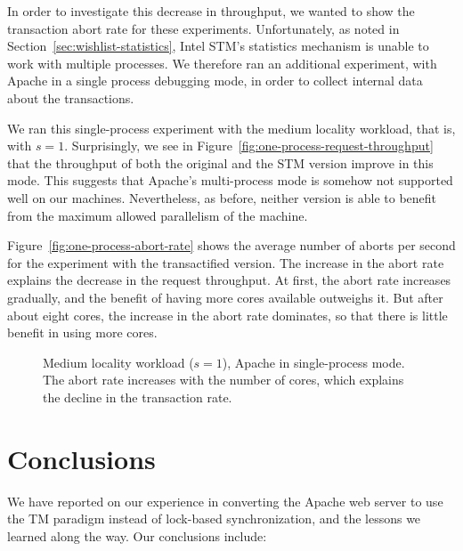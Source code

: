 \documentclass[preprint,11pt]{sigplanconf}
\begin{document}
In order to investigate this decrease in throughput, we wanted to show the
transaction abort rate for these experiments. Unfortunately, as noted in
Section~\ref{sec:wishlist-statistics}, Intel STM's statistics mechanism
is unable to work with multiple processes. We therefore ran an additional
experiment, with Apache in a single process debugging mode, in order to collect
internal data about the transactions. 

We ran this single-process experiment with the medium locality workload,
that is, with $s=1$. Surprisingly, we see
in Figure~\ref{fig:one-process-request-throughput} that the
throughput of both the original and the STM version improve in this mode.
This suggests that Apache's multi-process mode is somehow not supported
well on our machines. Nevertheless, as before, neither version is able to 
benefit from the maximum allowed parallelism of the machine. 

Figure~\ref{fig:one-process-abort-rate} shows the average number of aborts
per second for the experiment with the transactified version. 
The increase in the abort rate explains the decrease in the request
throughput. At first, the abort rate increases gradually, 
and the benefit of having more cores available outweighs it.
But after about eight cores, the increase in the abort rate dominates,
so that there is little benefit in using more cores. 

\begin{figure}
 \centering
 \hfill
 \caption{Medium locality workload ($s = 1$), Apache in single-process mode.
 The abort rate increases with the number of cores, which explains the decline 
 in the transaction rate.}
\end{figure}

\section{Conclusions}\label{sec:conclusions}

We have reported on our experience in converting the Apache web 
server to use the TM paradigm instead of lock-based synchronization,
and the lessons we learned along the way. Our conclusions include:
\end{document}
